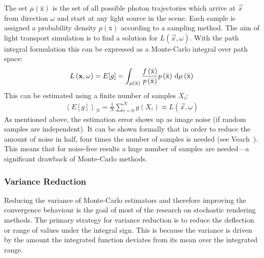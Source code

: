 The set $\mu\left(\bar{\mathrm{x}}\right)$ is the set of all possible photon trajectories which arrive at $\vec{x}$ from direction $\omega$ and start at any light source in the scene. Each sample is assigned a probability density $p\left(\bar{\mathrm{x}}\right)$ according to a sampling method. The aim of light transport simulation is to find a solution for $L(\vec{x}, \omega)$. With the path integral formulation this can be expressed as a Monte-Carlo integral over path space:
\begin{align}
L\left(\mathbf{x},\omega\right) = E[g] = \int_{\mu\left(\bar{\mathrm{x}}\right)} \frac{f\left(\bar{\mathrm{x}}\right)}{p\left(\bar{\mathrm{x}}\right)}p\left(\bar{\mathrm{x}}\right)
\,\mathrm{d}\mu\left(\bar{\mathrm{x}}\right)
\end{align}
This can be estimated using a finite number of samples $X_i$:
\begin{align}
\left<E[g]\right>_N = 
\frac{1}{N}\sum_{i=0}^{N}
g\left(X_i\right)
\approx
L\left(\vec{x},\omega\right)
\end{align}
As mentioned above, the estimation error shows up as image noise (if random samples are independent). It can be shown formally that in order to reduce the amount of noise in half, four times the number of samples is needed (see Veach~\cite{VeachThesis97}). This means that for noise-free results a huge number of samples are needed---a significant drawback of Monte-Carlo methods.

\subsubsection*{Variance Reduction}

Reducing the variance of Monte-Carlo estimators and therefore improving the convergence behaviour is the goal of most of the research on stochastic rendering methods. The primary strategy for variance reduction is to reduce the deflection or range of values under the integral sign. This is because the variance is driven by the amount the integrated function deviates from its mean over the integrated range.

